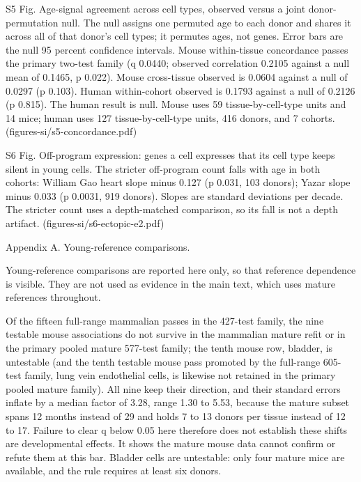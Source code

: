 \documentclass[11pt]{article}
\begin{document}
S5 Fig. Age-signal agreement across cell types, observed versus a joint donor-permutation null. The null assigns one permuted age to each donor and shares it across all of that donor's cell types; it permutes ages, not genes. Error bars are the null 95 percent confidence intervals. Mouse within-tissue concordance passes the primary two-test family (q 0.0440; observed correlation 0.2105 against a null mean of 0.1465, p 0.022). Mouse cross-tissue observed is 0.0604 against a null of 0.0297 (p 0.103). Human within-cohort observed is 0.1793 against a null of 0.2126 (p 0.815). The human result is null. Mouse uses 59 tissue-by-cell-type units and 14 mice; human uses 127 tissue-by-cell-type units, 416 donors, and 7 cohorts. (figures-si/s5-concordance.pdf)

S6 Fig. Off-program expression: genes a cell expresses that its cell type keeps silent in young cells. The stricter off-program count falls with age in both cohorts: William Gao heart slope minus 0.127 (p 0.031, 103 donors); Yazar slope minus 0.033 (p 0.0031, 919 donors). Slopes are standard deviations per decade. The stricter count uses a depth-matched comparison, so its fall is not a depth artifact. (figures-si/s6-ectopic-e2.pdf)

Appendix A. Young-reference comparisons.

Young-reference comparisons are reported here only, so that reference dependence is visible. They are not used as evidence in the main text, which uses mature references throughout.

Of the fifteen full-range mammalian passes in the 427-test family, the nine testable mouse associations do not survive in the mammalian mature refit or in the primary pooled mature 577-test family; the tenth mouse row, bladder, is untestable (and the tenth testable mouse pass promoted by the full-range 605-test family, lung vein endothelial cells, is likewise not retained in the primary pooled mature family). All nine keep their direction, and their standard errors inflate by a median factor of 3.28, range 1.30 to 5.53, because the mature subset spans 12 months instead of 29 and holds 7 to 13 donors per tissue instead of 12 to 17. Failure to clear q below 0.05 here therefore does not establish these shifts are developmental effects. It shows the mature mouse data cannot confirm or refute them at this bar. Bladder cells are untestable: only four mature mice are available, and the rule requires at least six donors.
\end{document}
